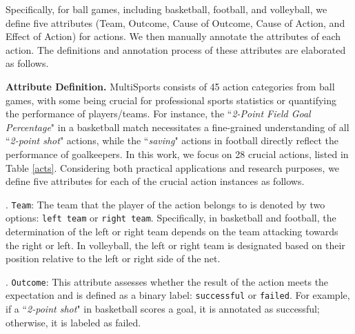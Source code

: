 {Specifically, for ball games, including basketball, football, and volleyball, we define five attributes (Team, Outcome, Cause of Outcome, Cause of Action, and Effect of Action) for actions. We then manually annotate the attributes of each action. The definitions and annotation process of these attributes are elaborated as follows.


\noindent\textbf{Attribute Definition.} MultiSports consists of 45 action categories from ball games, with some being crucial for professional sports statistics or quantifying the performance of players/teams. For instance, the ``\textit{2-Point Field Goal Percentage}" in a basketball match necessitates a fine-grained understanding of all ``\textit{2-point shot}" actions, while the ``\textit{saving}" actions in football directly reflect the performance of goalkeepers. In this work, we focus on 28 crucial actions, listed in Table \ref{acts}. Considering both practical applications and research purposes, we define five attributes for each of the crucial action instances as follows.

. \texttt{Team}: The team that the player of the action belongs to is denoted by two options: \texttt{left team} or \texttt{right team}. Specifically, in basketball and football, the determination of the left or right team depends on the team attacking towards the right or left. In volleyball, the left or right team is designated based on their position relative to the left or right side of the net.

. \texttt{Outcome}: This attribute assesses whether the result of the action meets the expectation and is defined as a binary label: \texttt{successful} or \texttt{failed}. For example, if a ``\textit{2-point shot}" in basketball scores a goal, it is annotated as successful; otherwise, it is labeled as failed.

}
